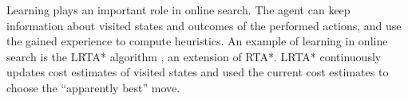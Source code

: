 Learning plays an important role in online search. The agent can keep
information about visited states and outcomes of the performed
actions, and use the gained experience to compute heuristics. An
example of learning in online search is the LRTA* algorithm
\cite{Korf.rta}, an extension of RTA*. LRTA* continuously
updates cost estimates of visited states and used the current cost
estimates to choose the ``apparently best'' move.


